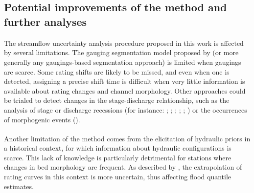     
    \subsection{Potential improvements of the method and further analyses}
    \paragraph{}
    The streamflow uncertainty analysis procedure proposed in this work is affected by several limitations. The gauging segmentation model proposed by \citet{darienzo_detection_2021} (or more generally any gaugings-based segmentation approach) is limited when gaugings are scarce. Some rating shifts are likely to be missed, and even when one is detected, assigning a precise shift time is difficult when very little information is available about rating changes and channel morphology. Other approaches could be trialed to detect changes in the stage-discharge relationship, such as the analysis of stage or discharge recessions (for instance: \citet{nathan_evaluation_1990}; \citet{tallaksen_review_1995}; \citet{vogel_estimation_1996}; \citet{chapman_comparison_1999}; \citet{lang_extrapolation_2010}; \citet{darienzo_detection_2021-1}) or the occurrences of morphogenic events (\citet{darienzo_detection_2021-1}).    
    \paragraph{}
    Another limitation of the method comes from the elicitation of hydraulic priors in a historical context, for which information about hydraulic configurations is scarce. This lack of knowledge is particularly detrimental for stations where changes in bed morphology are frequent. As described by \citet{petersen-overleir_accounting_2009}, the extrapolation of rating curves in this context is more uncertain, thus affecting flood quantile estimates. 
